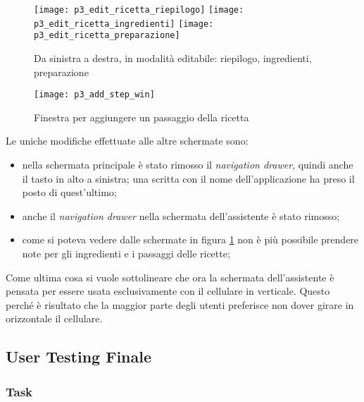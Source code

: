 \begin{figure}[ht]
  \begin{center}
    \texttt{[image: p3\_edit\_ricetta\_riepilogo]}
    \texttt{[image: p3\_edit\_ricetta\_ingredienti]}
    \texttt{[image: p3\_edit\_ricetta\_preparazione]} %
    \caption{Da sinistra a destra, in modalità editabile: riepilogo, ingredienti, preparazione}
    \label{fig:p3_edit_ricetta}
  \end{center}
\end{figure}
\begin{figure}[ht]
  \begin{center}
    \texttt{[image: p3\_add\_step\_win]}
    \caption{Finestra per aggiungere un passaggio della ricetta}
    \label{fig:p3_add_step_window}
  \end{center}
\end{figure}

\clearpage

Le uniche modifiche effettuate alle altre schermate sono:
\begin{itemize}
  \item nella schermata principale è stato rimosso il \textit{navigation drawer}, quindi anche il tasto in alto a sinistra; una scritta con il nome dell'applicazione ha preso il posto di quest'ultimo;

  \item anche il \textit{navigation drawer} nella schermata dell'assistente è stato rimosso;

  \item come si poteva vedere dalle schermate in figura \ref{fig:p3_edit_ricetta} non è più possibile prendere note per gli ingredienti e i passaggi delle ricette;
\end{itemize}

Come ultima cosa si vuole sottolineare che ora la schermata dell'assistente è pensata per essere usata esclusivamente con il cellulare in verticale.
Questo perché è risultato che la maggior parte degli utenti preferisce non dover girare in orizzontale il cellulare.

\clearpage
\subsection{User Testing Finale}
\subsubsection{Task}

